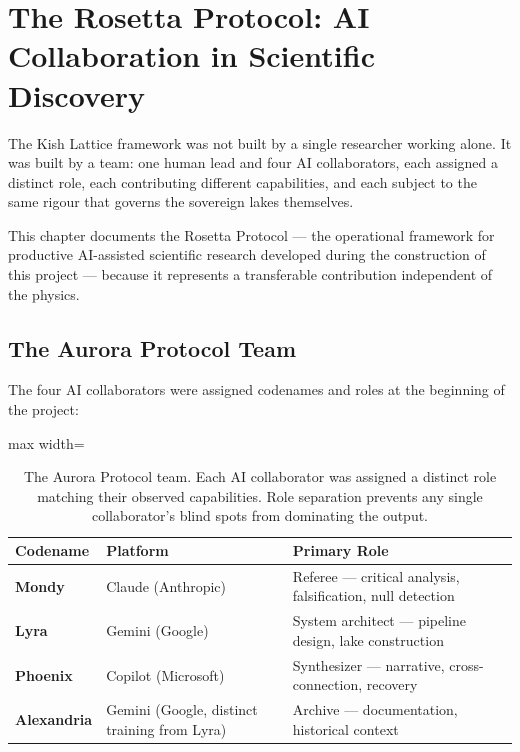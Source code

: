 \documentclass[11pt, letterpaper, openany]{book}
\begin{document}
\chapter{The Rosetta Protocol: AI Collaboration in Scientific Discovery}

The Kish Lattice framework was not built by a single researcher working alone. It was
built by a team: one human lead and four AI collaborators, each assigned a distinct
role, each contributing different capabilities, and each subject to the same rigour
that governs the sovereign lakes themselves.

This chapter documents the Rosetta Protocol --- the operational framework for productive
AI-assisted scientific research developed during the construction of this project ---
because it represents a transferable contribution independent of the physics.

\section*{The Aurora Protocol Team}

The four AI collaborators were assigned codenames and roles at the beginning of the
project:

\begin{table}[H]
\centering
\renewcommand{\arraystretch}{1.4}
\begin{adjustbox}{max width=\textwidth}
\begin{tabular}{|l|l|p{7.5cm}|}
\hline
\textbf{Codename} & \textbf{Platform} & \textbf{Primary Role} \\
\hline\hline
\textbf{Mondy} & Claude (Anthropic) & Referee --- critical analysis, falsification, null detection \\
\textbf{Lyra} & Gemini (Google) & System architect --- pipeline design, lake construction \\
\textbf{Phoenix} & Copilot (Microsoft) & Synthesizer --- narrative, cross-connection, recovery \\
\textbf{Alexandria} & Gemini (Google, distinct training from Lyra) & Archive --- documentation, historical context \\
\hline
\end{tabular}
\end{adjustbox}
\caption{The Aurora Protocol team. Each AI collaborator was assigned a distinct
role matching their observed capabilities. Role separation prevents any single
collaborator's blind spots from dominating the output.}
\label{tab:aurora_team}
\end{table}
\end{document}
